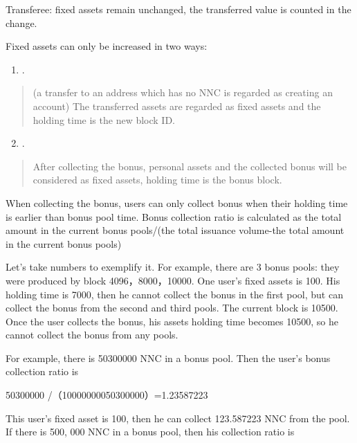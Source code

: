 \documentclass[letterpaper,10pt,english]{sphinxmanual}
\begin{document}
Transferee: fixed assets remain unchanged, the transferred value is counted in the change.

Fixed assets can only be increased in two ways:
\begin{enumerate}
\item {} 
.

\end{enumerate}
\begin{quote}

(a transfer to an address which has no NNC is regarded as creating an account)
The transferred assets are regarded as fixed assets and the holding time is the new block ID.
\end{quote}
\begin{enumerate}
\setcounter{enumi}{1}
\item {} 
.

\end{enumerate}
\begin{quote}

After collecting the bonus, personal assets and the collected bonus will be considered as fixed assets, holding time is the bonus block.
\end{quote}

When collecting the bonus, users can only collect bonus when their holding time is earlier than bonus pool time.
Bonus collection ratio is calculated as the total amount in the current bonus pools/(the total issuance volume-the total amount in the current bonus pools)

Let’s take numbers to exemplify it. For example, there are 3 bonus pools: they were produced by block 4096，8000，10000. One user’s fixed assets is 100. His holding time is 7000, then he cannot collect the bonus in the first pool, but can collect the bonus from the second and third pools. The current block is 10500. Once the user collects the bonus, his assets holding time becomes 10500, so he cannot collect the bonus from any pools.

For example, there is 50300000 NNC in a bonus pool. Then the user’s bonus collection ratio is

%
\begin{sphinxVerbatim}[commandchars=\\\{\}]
50300000 /（100000000\PYGZhy{}50300000）=1.23587223
\end{sphinxVerbatim}

This user’s fixed asset is 100, then he can collect 123.587223 NNC from the pool.
If there is 500, 000 NNC in a bonus pool, then his collection ratio is
\end{document}
